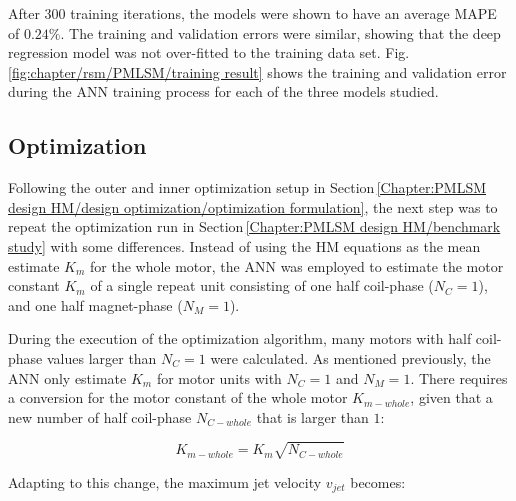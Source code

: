             
            After $300$ training iterations, the models were shown to have an average \acf{MAPE} of $0.24\%$. The training and validation errors were similar, showing that the deep regression model was not over-fitted to the training data set. Fig.\,\ref{fig:chapter/rsm/PMLSM/training result} shows the training and validation error during the \acs{ANN} training process for each of the three models studied.
            
        
        \subsection{Optimization}                   \label{Chapter:RSM/PMLSM/Optimization}
        
        
            Following the outer and inner optimization setup in Section\,\ref{Chapter:PMLSM design HM/design optimization/optimization formulation}, the next step was to repeat the optimization run in Section\,\ref{Chapter:PMLSM design HM/benchmark study} with some differences. Instead of using the \acs{HM} equations as the mean estimate $K_m$ for the whole motor, the \acs{ANN} was employed to estimate the motor constant $K_m$ of a single repeat unit consisting of one half coil-phase ($N_C = 1$), and one half magnet-phase ($N_M = 1$). 
            
            
            During the execution of the optimization algorithm, many motors with half coil-phase values larger than $N_C = 1$ were calculated. As mentioned previously, the \acs{ANN} only estimate $K_m$ for motor units with $N_C=1$ and $N_M=1$. There requires a conversion for the motor constant of the whole motor $K_{m-whole}$, given that a new number of half coil-phase $N_{C-whole}$ that is larger than $1$:
            
            
            \begin{equation}
                K_{m-whole}=K_m  \sqrt{N_{C-whole}}
                \label{eq:calculate new K_m based on new N_C}
            \end{equation}
            
            
            Adapting to this change, the maximum jet velocity $v_{jet}$ becomes:
            
